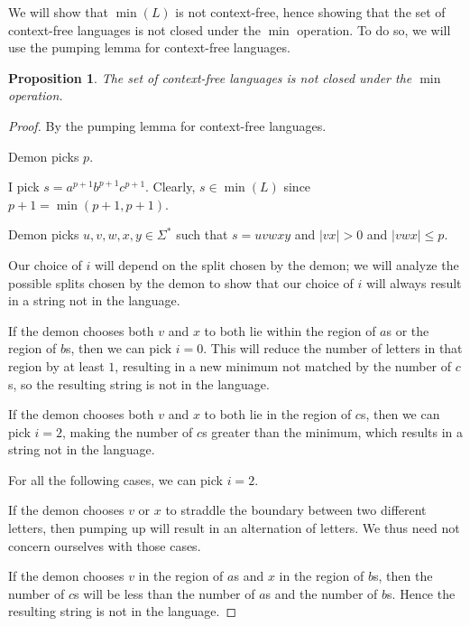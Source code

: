 \documentclass[letterpaper,11pt]{article}
\newtheorem{proposition}{Proposition}
\begin{document}
\begin{enumerate}
        We will show that $\min{(L)}$ is not context-free, hence showing that
        the set of context-free languages is not closed under the $\min$
        operation. To do so, we will use the pumping lemma for context-free
        languages.

        \begin{proposition}
            The set of context-free languages is not closed under the $\min$
            operation.
        \end{proposition}

        \begin{proof}
            By the pumping lemma for context-free languages.

            Demon picks $p$.

            I pick $s = a^{p+1} b^{p+1} c^{p+1}$. Clearly, $s \in \min{(L)}$
            since $p+1 = \min{(p+1, p+1)}$.

            Demon picks $u,v,w,x,y \in \Sigma^*$ such that $s = uvwxy$ and
            $|vx| > 0$ and $|vwx| \leq p$.

            Our choice of $i$ will depend on the split chosen by the demon;
            we will analyze the possible splits chosen by the demon to show
            that our choice of $i$ will always result in a string not in the
            language.

            If the demon chooses both $v$ and $x$ to both lie within the region
            of $a$s or the region of $b$s, then we can pick $i = 0$. This will
            reduce the number of letters in that region by at least $1$,
            resulting in a new minimum not matched by the number of $c$s,
            so the resulting string is not in the language.

            If the demon chooses both $v$ and $x$ to both lie in the region
            of $c$s, then we can pick $i = 2$, making the number of $c$s
            greater than the minimum, which results in a string not in the
            language.

            For all the following cases, we can pick $i = 2$.

            If the demon chooses $v$ or $x$ to straddle the boundary between
            two different letters, then pumping up will result in an
            alternation of letters. We thus need not concern ourselves with
            those cases.

            If the demon chooses $v$ in the region of $a$s and $x$ in the
            region of $b$s, then the number of $c$s will be less than the
            number of $a$s and the number of $b$s. Hence the resulting string
            is not in the language.


\end{proof}
\end{enumerate}
\end{document}
